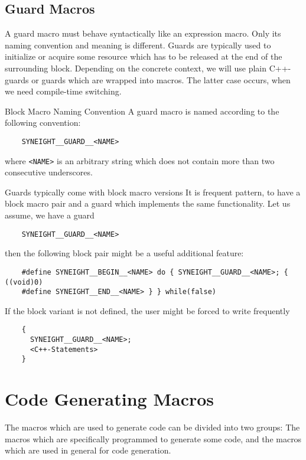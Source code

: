 \subsection{Guard Macros}
\label{sec:guard-macros}

A guard macro must behave syntactically like an expression macro. Only
its naming convention and meaning is different. 
%
Guards are typically used to initialize or acquire some resource which
has to be released at the end of the surrounding block. Depending on
the concrete context, we will use plain C++-guards or guards which are
wrapped into macros. The latter case occurs, when we need
compile-time switching. 
%
\begin{rule*}{Block Macro Naming Convention}
  A guard macro is named according to the following convention:
  \begin{verbatim}
    SYNEIGHT__GUARD__<NAME>
  \end{verbatim}
  where {\tt <NAME>} is an arbitrary string which does not contain
  more than two consecutive underscores.
\end{rule*}

\begin{remark*}{Guards typically come with block macro versions}
  It is frequent pattern, to have a block macro pair and a guard which
  implements the same functionality. Let us assume, we have a guard 
  \begin{verbatim}
    SYNEIGHT__GUARD__<NAME>
  \end{verbatim}
  then the following block pair might be a useful additional feature:
  \begin{verbatim}
    #define SYNEIGHT__BEGIN__<NAME> do { SYNEIGHT__GUARD__<NAME>; { ((void)0)
    #define SYNEIGHT__END__<NAME> } } while(false)
  \end{verbatim}
  If the block variant is not defined, the user might be forced to
  write frequently 
  \begin{verbatim}
    { 
      SYNEIGHT__GUARD__<NAME>; 
      <C++-Statements>
    }
  \end{verbatim}
\end{remark*}


\section{Code Generating Macros}
\label{sec:code-gener-macr}

The macros which are used to generate code can be divided into two
groups: The macros which are specifically programmed to generate some code,
and the macros which are used in general for code generation. 

